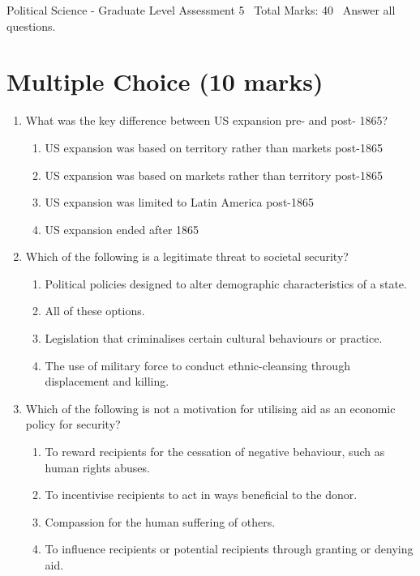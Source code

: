 \documentclass[12pt]{article}
\begin{document}
\begin{center}
Political Science - Graduate Level Assessment 5 \
Total Marks: 40 \
Answer all questions.
\end{center}

\section*{Multiple Choice (10 marks)}
\begin{enumerate}[label=\arabic*.]
\item What was the key difference between US expansion pre- and post- 1865?
\begin{enumerate}[label=(\alph*)]
    \item US expansion was based on territory rather than markets post-1865
    \item US expansion was based on markets rather than territory post-1865
    \item US expansion was limited to Latin America post-1865
    \item US expansion ended after 1865
\end{enumerate}
\item Which of the following is a legitimate threat to societal security?
\begin{enumerate}[label=(\alph*)]
    \item Political policies designed to alter demographic characteristics of a state.
    \item All of these options.
    \item Legislation that criminalises certain cultural behaviours or practice.
    \item The use of military force to conduct ethnic-cleansing through displacement and killing.
\end{enumerate}
\item Which of the following is not a motivation for utilising aid as an economic policy for security?
\begin{enumerate}[label=(\alph*)]
    \item To reward recipients for the cessation of negative behaviour, such as human rights abuses.
    \item To incentivise recipients to act in ways beneficial to the donor.
    \item Compassion for the human suffering of others.
    \item To influence recipients or potential recipients through granting or denying aid.
\end{enumerate}

\end{enumerate}
\end{document}
